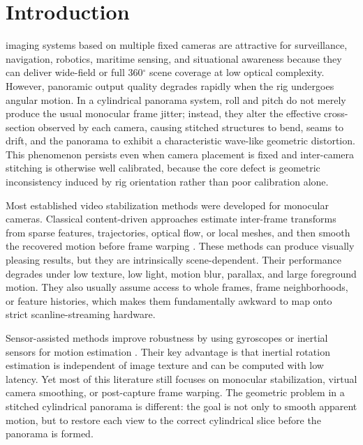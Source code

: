 \documentclass[journal]{IEEEtran}
\begin{document}
\section{Introduction}
 imaging systems based on multiple fixed cameras are attractive for surveillance, navigation, robotics, maritime sensing, and situational awareness because they can deliver wide-field or full 360$^\circ$ scene coverage at low optical complexity. However, panoramic output quality degrades rapidly when the rig undergoes angular motion. In a cylindrical panorama system, roll and pitch do not merely produce the usual monocular frame jitter; instead, they alter the effective cross-section observed by each camera, causing stitched structures to bend, seams to drift, and the panorama to exhibit a characteristic wave-like geometric distortion. This phenomenon persists even when camera placement is fixed and inter-camera stitching is otherwise well calibrated, because the core defect is geometric inconsistency induced by rig orientation rather than poor calibration alone.

Most established video stabilization methods were developed for monocular cameras. Classical content-driven approaches estimate inter-frame transforms from sparse features, trajectories, optical flow, or local meshes, and then smooth the recovered motion before frame warping \cite{liu2013bundled,liu2016meshflow,yu2021selfie,lee2021deep3d}. These methods can produce visually pleasing results, but they are intrinsically scene-dependent. Their performance degrades under low texture, low light, motion blur, parallax, and large foreground motion. They also usually assume access to whole frames, frame neighborhoods, or feature histories, which makes them fundamentally awkward to map onto strict scanline-streaming hardware.

Sensor-assisted methods improve robustness by using gyroscopes or inertial sensors for motion estimation \cite{karpenko2011gyro,han2021tmc,shi2022deepfvs,yu2025sensorflow}. Their key advantage is that inertial rotation estimation is independent of image texture and can be computed with low latency. Yet most of this literature still focuses on monocular stabilization, virtual camera smoothing, or post-capture frame warping. The geometric problem in a stitched cylindrical panorama is different: the goal is not only to smooth apparent motion, but to restore each view to the correct cylindrical slice before the panorama is formed.
\end{document}
